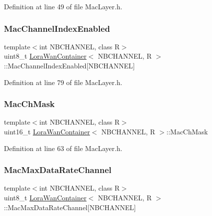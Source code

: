 Definition at line 49 of file Mac\+Layer.\+h.

\mbox{\label{class_lora_wan_container_acd49152da70498fc82299e77b2ede009}} 
\subsubsection{\texorpdfstring{Mac\+Channel\+Index\+Enabled}{MacChannelIndexEnabled}}
{\footnotesize\ttfamily template$<$int N\+B\+C\+H\+A\+N\+N\+EL, class R$>$ \\
uint8\+\_\+t \mbox{\hyperlink{class_lora_wan_container}{Lora\+Wan\+Container}}$<$ N\+B\+C\+H\+A\+N\+N\+EL, R $>$\+::Mac\+Channel\+Index\+Enabled\mbox{[}N\+B\+C\+H\+A\+N\+N\+EL\mbox{]}}



Definition at line 79 of file Mac\+Layer.\+h.

\mbox{\label{class_lora_wan_container_a64acd2df6bc04cce4d6a54a6a2ff8332}} 
\subsubsection{\texorpdfstring{Mac\+Ch\+Mask}{MacChMask}}
{\footnotesize\ttfamily template$<$int N\+B\+C\+H\+A\+N\+N\+EL, class R$>$ \\
uint16\+\_\+t \mbox{\hyperlink{class_lora_wan_container}{Lora\+Wan\+Container}}$<$ N\+B\+C\+H\+A\+N\+N\+EL, R $>$\+::Mac\+Ch\+Mask}



Definition at line 63 of file Mac\+Layer.\+h.

\mbox{\label{class_lora_wan_container_a7af736bad42311bdfba5a67fd2701140}} 
\subsubsection{\texorpdfstring{Mac\+Max\+Data\+Rate\+Channel}{MacMaxDataRateChannel}}
{\footnotesize\ttfamily template$<$int N\+B\+C\+H\+A\+N\+N\+EL, class R$>$ \\
uint8\+\_\+t \mbox{\hyperlink{class_lora_wan_container}{Lora\+Wan\+Container}}$<$ N\+B\+C\+H\+A\+N\+N\+EL, R $>$\+::Mac\+Max\+Data\+Rate\+Channel\mbox{[}N\+B\+C\+H\+A\+N\+N\+EL\mbox{]}}



